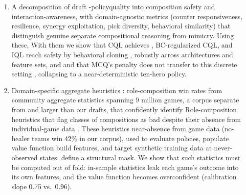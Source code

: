 \documentclass[journal]{IEEEtran}
\providecommand{\DIFaddtex}[1]{{\protect\color{blue} \sf #1}} %
\providecommand{\DIFdeltex}[1]{{\protect\color{red} \scriptsize #1}} %
\providecommand{\DIFaddbegin}{} %
\providecommand{\DIFaddend}{} %
\providecommand{\DIFdelbegin}{} %
\providecommand{\DIFdelend}{} %
\providecommand{\DIFadd}[1]{\texorpdfstring{\DIFaddtex{#1}}{#1}} %
\providecommand{\DIFdel}[1]{\texorpdfstring{\DIFdeltex{#1}}{}} %
\begin{document}
\begin{enumerate}
 \item A decomposition of draft\DIFdelbegin \DIFdel{-policy}\DIFdelend  quality into composition safety and interaction-awareness, with \DIFdelbegin \DIFdel{domain-agnostic }\DIFdelend metrics (counter responsiveness, resilience, synergy\DIFdelbegin \DIFdel{exploitation}\DIFdelend , pick diversity, behavioral similarity) that \DIFdelbegin \DIFdel{distinguish genuine }\DIFdelend \DIFaddbegin \DIFadd{separate }\DIFaddend compositional reasoning from mimicry. \DIFdelbegin \DIFdel{Using these, }\DIFdelend \DIFaddbegin \DIFadd{With them }\DIFaddend we show that CQL\DIFdelbegin \DIFdel{achieves }\DIFdelend \DIFaddbegin \DIFadd{, BC-regularized CQL, and IQL reach }\DIFaddend safety by behavioral cloning \DIFdelbegin \DIFdel{, robustly across architectures and feature sets, and }\DIFdelend \DIFaddbegin \DIFadd{and }\DIFaddend that MCQ's penalty does not transfer to this discrete setting\DIFdelbegin \DIFdel{, collapsing to a near-deterministic ten-hero policy}\DIFdelend .
 \item \DIFdelbegin \DIFdel{Domain-specific aggregate heuristics : role-composition win rates from community aggregate statistics spanning 9 million games, a corpus separate from and larger than our drafts, that confidently identify }\DIFdelend \DIFaddbegin \DIFadd{Role-composition heuristics that flag }\DIFaddend classes of compositions as bad despite their \DIFdelbegin \DIFdel{absence from individual-game data . These heuristics }\DIFdelend \DIFaddbegin \DIFadd{near-absence from game data (no-healer teams win 42\% in our corpus), used to }\DIFaddend evaluate policies, \DIFdelbegin \DIFdel{populate value function }\DIFdelend \DIFaddbegin \DIFadd{build }\DIFaddend features, and \DIFdelbegin \DIFdel{target synthetic training data at never-observed states. }\DIFdelend \DIFaddbegin \DIFadd{define a structural mask. We show that such statistics must be computed out of fold: in-sample statistics leak each game's outcome into its own features, and the value function becomes overconfident (calibration slope 0.75 vs.\ 0.96).
}
\end{enumerate}
\end{document}
